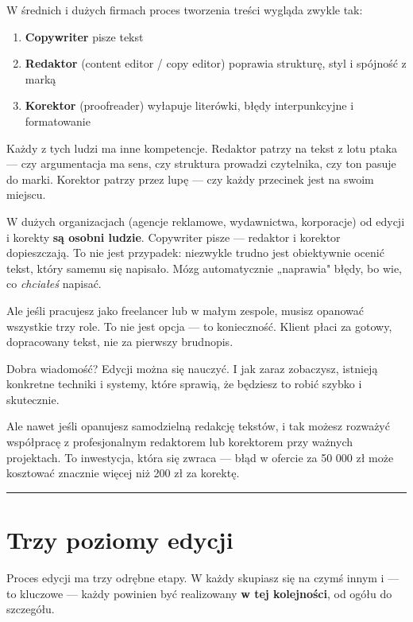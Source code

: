 \documentclass[
  12pt,
  a4paper,
  twoside,
  openright,
  12pt,
  DIV=12,
  BCOR=12mm]{scrbook}
\providecommand{\tightlist}{%
  \setlength{\itemsep}{0pt}\setlength{\parskip}{0pt}}\usepackage{longtable,booktabs,array}
\newcommand{\decoline}{%
  \begin{center}
    \textcolor{bordergray}{\rule{0.3\textwidth}{0.5pt}}
  \end{center}
}
\begin{document}
W średnich i dużych firmach proces tworzenia treści wygląda zwykle tak:

\begin{enumerate}
\def\labelenumi{\arabic{enumi}.}
\tightlist
\item
  \textbf{Copywriter} pisze tekst
\item
  \textbf{Redaktor} (content editor / copy editor) poprawia strukturę,
  styl i spójność z marką
\item
  \textbf{Korektor} (proofreader) wyłapuje literówki, błędy
  interpunkcyjne i formatowanie
\end{enumerate}

Każdy z tych ludzi ma inne kompetencje. Redaktor patrzy na tekst z lotu
ptaka --- czy argumentacja ma sens, czy struktura prowadzi czytelnika,
czy ton pasuje do marki. Korektor patrzy przez lupę --- czy każdy
przecinek jest na swoim miejscu.

\begin{wazne}
W dużych organizacjach (agencje reklamowe, wydawnictwa, korporacje) od edycji i korekty \textbf{są osobni ludzie}. Copywriter pisze --- redaktor i korektor dopieszczają. To nie jest przypadek: niezwykle trudno jest obiektywnie ocenić tekst, który samemu się napisało. Mózg automatycznie „naprawia" błędy, bo wie, co \textit{chciałeś} napisać.
\end{wazne}

Ale jeśli pracujesz jako freelancer lub w małym zespole, musisz opanować
wszystkie trzy role. To nie jest opcja --- to konieczność. Klient płaci
za gotowy, dopracowany tekst, nie za pierwszy brudnopis.

Dobra wiadomość? Edycji można się nauczyć. I jak zaraz zobaczysz,
istnieją konkretne techniki i systemy, które sprawią, że będziesz to
robić szybko i skutecznie.

Ale nawet jeśli opanujesz samodzielną redakcję tekstów, i tak możesz
rozważyć współpracę z profesjonalnym redaktorem lub korektorem przy
ważnych projektach. To inwestycja, która się zwraca --- błąd w ofercie
za 50 000 zł może kosztować znacznie więcej niż 200 zł za korektę.

\decoline

\section{Trzy poziomy edycji}\label{trzy-poziomy-edycji}

Proces edycji ma trzy odrębne etapy. W każdy skupiasz się na czymś innym
i --- to kluczowe --- każdy powinien być realizowany \textbf{w tej
kolejności}, od ogółu do szczegółu.
\end{document}
